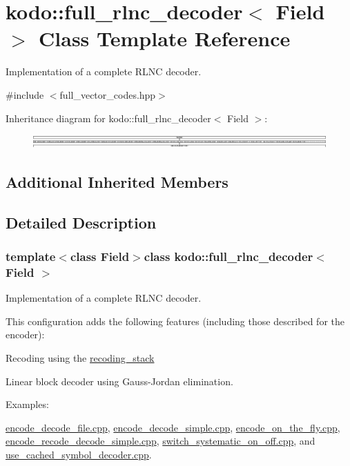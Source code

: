 \hypertarget{classkodo_1_1full__rlnc__decoder}{\section{kodo\-:\-:full\-\_\-rlnc\-\_\-decoder$<$ Field $>$ Class Template Reference}
\label{classkodo_1_1full__rlnc__decoder}
}


Implementation of a complete R\-L\-N\-C decoder.  




{\ttfamily \#include $<$full\-\_\-vector\-\_\-codes.\-hpp$>$}

Inheritance diagram for kodo\-:\-:full\-\_\-rlnc\-\_\-decoder$<$ Field $>$\-:\begin{figure}[H]
\begin{center}
\leavevmode
\includegraphics[height=0.523364cm]{classkodo_1_1full__rlnc__decoder}
\end{center}
\end{figure}
\subsection*{Additional Inherited Members}


\subsection{Detailed Description}
\subsubsection*{template$<$class Field$>$class kodo\-::full\-\_\-rlnc\-\_\-decoder$<$ Field $>$}

Implementation of a complete R\-L\-N\-C decoder. 

This configuration adds the following features (including those described for the encoder)\-:
\begin{DoxyItemize}
\item Recoding using the \hyperlink{classkodo_1_1recoding__stack}{recoding\-\_\-stack}
\item Linear block decoder using Gauss-\/\-Jordan elimination. 
\end{DoxyItemize}\begin{Desc}
\item[Examples\-: ]\par
\hyperlink{encode_decode_file_8cpp-example}{encode\-\_\-decode\-\_\-file.\-cpp}, \hyperlink{encode_decode_simple_8cpp-example}{encode\-\_\-decode\-\_\-simple.\-cpp}, \hyperlink{encode_on_the_fly_8cpp-example}{encode\-\_\-on\-\_\-the\-\_\-fly.\-cpp}, \hyperlink{encode_recode_decode_simple_8cpp-example}{encode\-\_\-recode\-\_\-decode\-\_\-simple.\-cpp}, \hyperlink{switch_systematic_on_off_8cpp-example}{switch\-\_\-systematic\-\_\-on\-\_\-off.\-cpp}, and \hyperlink{use_cached_symbol_decoder_8cpp-example}{use\-\_\-cached\-\_\-symbol\-\_\-decoder.\-cpp}.\end{Desc}


